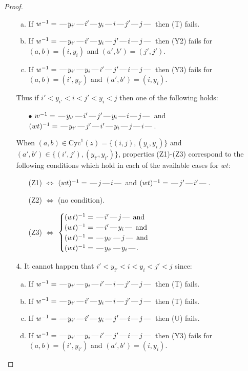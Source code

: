 \documentclass[10pt]{article}
\theoremstyle{definition}
\theoremstyle{definition}
\def\dash{\text{\hspace{0.5mm}---\hspace{0.5mm}}}
\def\Cyc{\mathrm{Cyc}}
\begin{document}
\begin{proof}
\begin{enumerate}
\begin{enumerate}[(a)]
\item If $w^{-1} = \dash y_{i'}\dash i'\dash y_i\dash i\dash j'\dash j\dash $ then (T) fails.
\item If $w^{-1} = \dash y_{i'}\dash i'\dash y_i\dash j'\dash i\dash j\dash $ then (Y2) fails for $(a,b)=(i,y_i)$ and $(a',b')=(j',j')$.
\item If $w^{-1} = \dash y_{i'}\dash y_i\dash i'\dash j'\dash i\dash j\dash $ then (Y3) fails for $(a,b)=(i',y_{i'})$ and $(a',b')=(i,y_i)$.
\end{enumerate}
Thus if $i' < y_{i'} < i < j' < y_i < j$ then one of the following holds:
\begin{enumerate}
\item[$\bullet$] $w^{-1} = \dash y_{i'}\dash i'\dash j'\dash y_i\dash i\dash j\dash $ and $(wt)^{-1} = \dash y_{i'}\dash j'\dash i'\dash y_i\dash j\dash i\dash $.
\end{enumerate}
When $(a,b)\in\Cyc^1(z)=\{(i,j),(y_i,y_i)\}$ and $(a',b')\in\{(i',j'),(y_{i'},y_{i'})\}$,
properties (Z1)-(Z3) correspond to the following conditions which
hold in each of the available cases for $wt$:
\begin{enumerate}
\item[](Z1) $\Leftrightarrow$ $(wt)^{-1} = \dash j \dash i \dash$  and $(wt)^{-1} = \dash j' \dash i' \dash$.
\item[](Z2) $\Leftrightarrow$ (no condition).
\item[](Z3) $\Leftrightarrow$ $\begin{cases}\text{$(wt)^{-1} = \dash i' \dash j \dash$}\text{ and }\\
\text{$(wt)^{-1} = \dash i' \dash y_i \dash$}\text{ and }\\
\text{$(wt)^{-1} = \dash y_{i'} \dash j \dash$}\text{ and }\\
\text{$(wt)^{-1} = \dash y_{i'} \dash y_i \dash$}.\end{cases}$
\end{enumerate}
\item[$4$.] It cannot happen that $i' < y_{i'} < i < y_i < j' < j$ since:
\begin{enumerate}[(a)]
\item If $w^{-1} = \dash y_{i'}\dash y_i\dash i'\dash i\dash j'\dash j\dash $ then (T) fails.
\item If $w^{-1} = \dash y_{i'}\dash i'\dash y_i\dash i\dash j'\dash j\dash $ then (T) fails.
\item If $w^{-1} = \dash y_{i'}\dash i'\dash y_i\dash j'\dash i\dash j\dash $ then (U) fails.
\item If $w^{-1} = \dash y_{i'}\dash y_i\dash i'\dash j'\dash i\dash j\dash $ then (Y3) fails for $(a,b)=(i',y_{i'})$ and $(a',b')=(i,y_i)$.

\end{enumerate}
\end{enumerate}
\end{proof}
\end{document}
